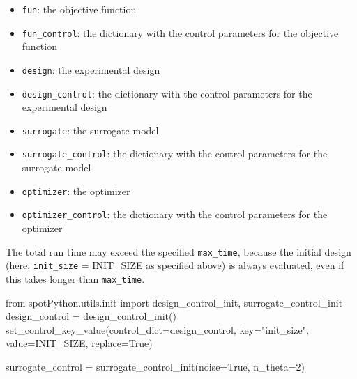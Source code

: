 \documentclass[
  letterpaper,
  DIV=11,
  numbers=noendperiod]{scrreprt}
\newenvironment{Shaded}{\begin{snugshade}}{\end{snugshade}}
\newcommand{\DecValTok}[1]{\textcolor[rgb]{0.68,0.00,0.00}{#1}}
\newcommand{\ImportTok}[1]{\textcolor[rgb]{0.00,0.46,0.62}{#1}}
\newcommand{\NormalTok}[1]{\textcolor[rgb]{0.00,0.23,0.31}{#1}}
\newcommand{\OperatorTok}[1]{\textcolor[rgb]{0.37,0.37,0.37}{#1}}
\newcommand{\StringTok}[1]{\textcolor[rgb]{0.13,0.47,0.30}{#1}}
\newcommand{\VariableTok}[1]{\textcolor[rgb]{0.07,0.07,0.07}{#1}}
\providecommand{\tightlist}{%
  \setlength{\itemsep}{0pt}\setlength{\parskip}{0pt}}\usepackage{longtable,booktabs,array}
\begin{document}
\begin{itemize}
\tightlist
\item
  \texttt{fun}: the objective function
\item
  \texttt{fun\_control}: the dictionary with the control parameters for
  the objective function
\item
  \texttt{design}: the experimental design
\item
  \texttt{design\_control}: the dictionary with the control parameters
  for the experimental design
\item
  \texttt{surrogate}: the surrogate model
\item
  \texttt{surrogate\_control}: the dictionary with the control
  parameters for the surrogate model
\item
  \texttt{optimizer}: the optimizer
\item
  \texttt{optimizer\_control}: the dictionary with the control
  parameters for the optimizer
\end{itemize}

\begin{tcolorbox}[enhanced jigsaw, rightrule=.15mm, coltitle=black, title=\textcolor{quarto-callout-note-color}{\faInfo}\hspace{0.5em}{Note: Total run time}, opacitybacktitle=0.6, bottomrule=.15mm, opacityback=0, left=2mm, colback=white, leftrule=.75mm, colframe=quarto-callout-note-color-frame, colbacktitle=quarto-callout-note-color!10!white, toprule=.15mm, toptitle=1mm, bottomtitle=1mm, titlerule=0mm, breakable, arc=.35mm]

The total run time may exceed the specified \texttt{max\_time}, because
the initial design (here: \texttt{init\_size} = INIT\_SIZE as specified
above) is always evaluated, even if this takes longer than
\texttt{max\_time}.

\end{tcolorbox}

\begin{Shaded}
\begin{Highlighting}[]
\ImportTok{from}\NormalTok{ spotPython.utils.init }\ImportTok{import}\NormalTok{ design\_control\_init, surrogate\_control\_init}
\NormalTok{design\_control }\OperatorTok{=}\NormalTok{ design\_control\_init()}
\NormalTok{set\_control\_key\_value(control\_dict}\OperatorTok{=}\NormalTok{design\_control,}
\NormalTok{                        key}\OperatorTok{=}\StringTok{"init\_size"}\NormalTok{,}
\NormalTok{                        value}\OperatorTok{=}\NormalTok{INIT\_SIZE,}
\NormalTok{                        replace}\OperatorTok{=}\VariableTok{True}\NormalTok{)}

\NormalTok{surrogate\_control }\OperatorTok{=}\NormalTok{ surrogate\_control\_init(noise}\OperatorTok{=}\VariableTok{True}\NormalTok{,}
\NormalTok{                                           n\_theta}\OperatorTok{=}\DecValTok{2}\NormalTok{)}
\end{Highlighting}
\end{Shaded}
\end{document}
